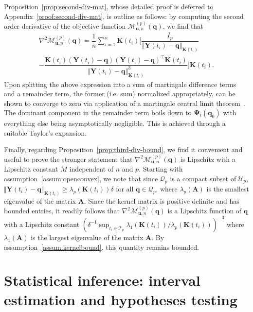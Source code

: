 \documentclass[aos]{imsart}
\theoremstyle{plain}
\theoremstyle{remark}
\newcommand{\Mcal}{\mathcal{M}}
\newcommand{\Tcal}{\mathcal{T}}
\newcommand{\bb}[1]{\boldsymbol{#1}}
\newcommand{\tr}{^{\intercal}}
\newcommand{\cnam}[1]{\textcolor{mypurple}{#1}}
\begin{document}
\cnam{Proposition~\ref{prop:second-div-mat}, whose detailed proof is deferred to Appendix~\ref{proof:second-div-mat}, is outline as follows: by computing the second order derivative of the objective function $\Mcal_{\bb{u},n}^{(p)}(\bb{q})$, we find that
\begin{multline*}
    \nabla^2 \Mcal_{\bb{u},n}^{(p)}(\bb{q}) 
    = \dfrac{1}{n}\sum_{i=1}^n \bb{K}(t_i) \biggl[ \dfrac{I_p}{\left\Vert  \bb{Y}(t_i) - \bb{q} \right\Vert_{\bb{K}(t_i)} } 
\\ - \dfrac{\bb{K}(t_i)(\bb{Y}(t_i) - \bb{q})(\bb{Y}(t_i) - \bb{q})\tr \bb{K}(t_i)}{\left\Vert  \bb{Y}(t_i) - \bb{q} \right\Vert^3_{\bb{K}(t_i)}} \biggr] \bb{K}(t_i).
\end{multline*}
Upon splitting the above expression into a sum of martingale difference terms and a remainder term, the former (i.e. sum) normalized appropriately, can be shown to converge to zero via application of a martingale central limit theorem~\citep[see][]{belloni2018high}. The dominant component in the remainder term  boils down to $\bb{\Psi}_t(\bb{q}_0)$ with everything else being asymptotically negligible. This is achieved through a suitable Taylor's expansion.}

Finally, \cnam{regarding Proposition~\ref{prop:third-div-bound}, we find it convenient and useful} to prove the stronger statement that $\nabla^2 \Mcal_{\bb{u},n}^{(p)}(\bb{q})$ is Lipschitz with a Lipschitz constant $M$ independent of $n$ and $p$.  Starting with assumption~\ref{assum:openconvex}, we note that since $\mathcal{Q}_p$ is a compact subset of $\mathcal{U}_p$, $\Vert \bb{Y}(t_i) - \bb{q} \Vert_{\bb{K}(t_i)} \geq \lambda_p(\bb{K}(t_i)) \delta$ for all $\bb{q} \in \mathcal{Q}_p$, where $\lambda_p(\bb{A})$ is the smallest eigenvalue of the matrix $\bb{A}$. Since the kernel matrix is positive definite and has bounded entries,  it readily follows that $\nabla^2 \Mcal_{\bb{u},n}^{(p)}(\bb{q})$ is a Lipschitz function of $\bb{q}$ with a Lipschitz constant $\left(\delta^{-1} \sup_{t_i \in \Tcal_p} \lambda_1(\bb{K}(t_i))/\lambda_p(\bb{K}(t_i))\right)^{-3}$ where $\lambda_1(\bb{A})$ is the largest eigenvalue of the matrix $\bb{A}$. By assumption~\ref{assum:kernelbound}, this quantity remains bounded.




\section{Statistical inference: interval estimation and hypotheses testing}\label{sec:ht}
\end{document}

